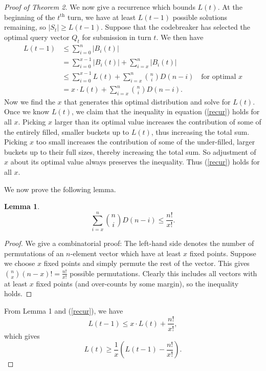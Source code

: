 \documentclass[12pt, a4paper]{article}
\newtheorem{lemma}{Lemma}
\begin{document}
\begin{proof}[Proof of Theorem 2]
		 We now give a recurrence which bounds $L(t)$. At the beginning of the $t^\text{th}$ turn, we have at least $L(t-1)$ possible solutions remaining, so $|S_t|\ge L(t-1)$. Suppose that the codebreaker has selected the optimal query vector $Q_t$ for submission in turn $t$. We then have 
		\begin{align}\label{recur}
			L(t-1)
			& \le \sum_{i = 0}^{n}|B_i(t)|\nonumber\\
			& = \sum_{i=0}^{x-1}|B_i(t)| + \sum_{i=x}^{n}|B_i(t)|\nonumber\\
			& \le \sum_{i = 0}^{x-1}L(t) + \sum_{i=x}^{n}\binom{n}{i}D(n-i)\quad
			\text{for optimal $x$}\nonumber\\
			& = x\cdot L(t) + \sum_{i = x}^{n}\binom{n}{i}D(n-i).
		\end{align}
		Now we find the $x$ that generates this optimal distribution and solve for $L(t)$. Once we know $L(t)$, we claim that the inequality in equation (\ref{recur}) holds for all $x$. Picking $x$ larger than its optimal value increases the contribution of some of the entirely filled, smaller buckets up to $L(t)$, thus increasing the total sum. Picking $x$ too small increases the contribution of some of the under-filled, larger buckets up to their full sizes, thereby increasing the total sum. So adjustment of $x$ about its optimal value always preserves the inequality. Thus (\ref{recur}) holds for all $x$.
		
		
		We now prove the following lemma.
		\begin{lemma}
			\begin{equation*}
				\sum_{i=x}^n\binom{n}{i}D(n-i) \le \frac{n!}{x!}.
			\end{equation*}
		\end{lemma}
			\begin{proof}
				We give a combinatorial proof: The left-hand side denotes the number of permutations of an $n$-element vector which have at least $x$ fixed points. Suppose we choose $x$ fixed points and simply permute the rest of the vector. This gives $\binom{n}{x}(n-x)!=\frac{n!}{x!}$ possible permutations. Clearly this includes all vectors with at least $x$ fixed points (and over-counts by some margin), so the inequality holds.
			\end{proof}

		
		From Lemma 1 and (\ref{recur}), we have
		\begin{equation*}
			L(t-1) \le x\cdot L(t) + \frac{n!}{x!},
		\end{equation*}
		which gives
		\begin{equation*}
			L(t)\ge \frac{1}{x}\left(L(t-1)-\frac{n!}{x!}\right).
		\end{equation*}
		

\end{proof}
\end{document}
